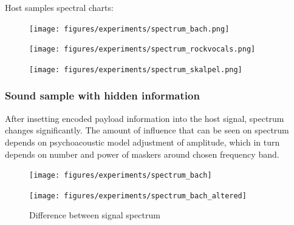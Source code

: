 \clearpage
\noindent Host samples spectral charts:

\begin{figure}[!hb]
\begin{minipage}[b]{0.45\textwidth}
  \texttt{[image: figures/experiments/spectrum\_bach.png]}
  \label{fig:bach-analysis}
\end{minipage}\hfill
\begin{minipage}[b]{0.45\textwidth}
  \texttt{[image: figures/experiments/spectrum\_rockvocals.png]}
  \label{fig:rockvocals-analysis}
\end{minipage}
\end{figure}
\begin{figure}[!hb]
\begin{minipage}[b]{0.45\textwidth}
  \texttt{[image: figures/experiments/spectrum\_skalpel.png]}
  \label{fig:skalpel-analysis}
\end{minipage}
\end{figure}

\clearpage

\subsubsection{Sound sample with hidden information}
After insetting encoded payload information into the host signal, spectrum changes significantly.
The amount of influence that can be seen on spectrum depends on psychoacoustic model adjustment of amplitude, which in turn depends on number and power of maskers around chosen frequency band.


\begin{figure}[!hb]
  \begin{minipage}[b]{0.45\textwidth}
    \texttt{[image: figures/experiments/spectrum\_bach]}
  \end{minipage}\hfill
  \begin{minipage}[b]{0.45\textwidth}
    \texttt{[image: figures/experiments/spectrum\_bach\_altered]}
  \end{minipage}
  \caption{Difference between signal spectrum}
\end{figure}

\clearpage

